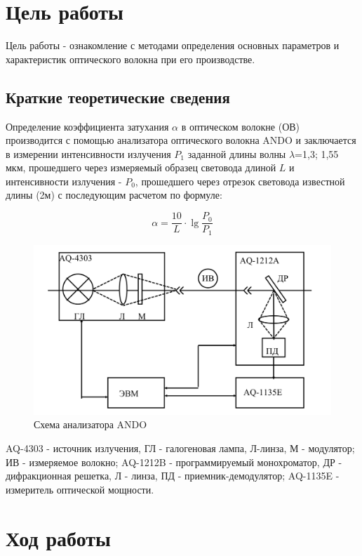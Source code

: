\chapter{Цель работы}

Цель работы - ознакомление с методами определения основных параметров и характеристик оптического волокна при его производстве.

\section{Краткие теоретические сведения}

Определение коэффициента затухания $\alpha$ в оптическом волокне (ОВ) 
производится с помощью анализатора оптического волокна ANDO и
 заключается в измерении интенсивности излучения $P_1$ заданной
  длины волны $\lambda$=1,3; 1,55 мкм, прошедшего через измеряемый образец 
  световода длиной $L$ и интенсивности излучения - $P_0$,
   прошедшего через отрезок световода известной длины (2м) с последующим расчетом по формуле:

\[
\alpha =\frac{10}{L} \cdot \lg{\frac{P_0}{P_1}}
\]



\begin{figure}[h!]
	\centering
	\caption{Схема анализатора ANDO}
	\includegraphics[width=.8\textwidth]{images/ando.png}
\end{figure}

AQ-4303 - источник излучения, ГЛ - галогеновая лампа, Л-линза, М - модулятор; 
ИВ - измеряемое волокно;
AQ-1212B - программируемый монохроматор, ДР - дифракционная решетка, Л - линза, ПД - приемник-демодулятор;
AQ-1135E - измеритель оптической мощности.

\chapter{Ход работы}

